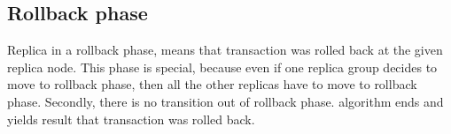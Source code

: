




       

\subsection{Rollback phase}
Replica in a rollback phase, means that transaction was rolled back at the given replica node. 
This phase is special, because even if one replica group decides to move to rollback phase, then all the other replicas have to move to rollback phase. Secondly, there is no transition out of rollback phase. \mpt algorithm ends and yields result that transaction was rolled back.

